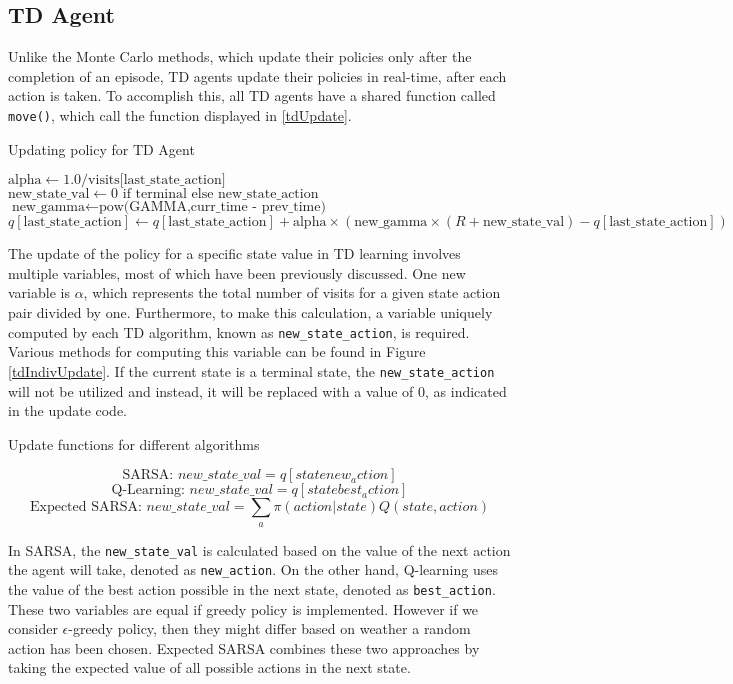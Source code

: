 \subsection{TD Agent}	
Unlike the Monte Carlo methods, which update their policies only after the completion of an episode, TD agents update their policies in real-time, after each action is taken. To accomplish this, all TD agents have a shared function called \texttt{move()}, which call the function displayed in \ref{tdUpdate}. 

\begin{algorithm}
\caption{Updating policy for TD Agent}\label{tdUpdate}
\begin{algorithmic}[1]
\State $ \text{alpha} \gets 1.0 / \text{visits[last_state_action]}$
\State $\text{new_state_val} \gets 0 \text{ if terminal else new_state_action}$
\State $\text{new_gamma} \gets \text{pow(GAMMA,curr_time - prev_time)}$
\State $q[\text{last_state_action}] \gets q[\text{last_state_action}] + \text{alpha} \times (\text{new_gamma} \times (R + \text{new_state_val}) - q[\text{last_state_action}])$
\end{algorithmic}
\end{algorithm}


The update of the policy for a specific state value in TD learning involves multiple variables, most of which have been previously discussed. One new variable is $\alpha$, which represents the total number of visits for a given state action pair divided by one. Furthermore, to make this calculation, a variable uniquely computed by each TD algorithm, known as \texttt{new\_state\_action}, is required. Various methods for computing this variable can be found in Figure \ref{tdIndivUpdate}. If the current state is a terminal state, the \texttt{new\_state\_action} will not be utilized and instead, it will be replaced with a value of 0, as indicated in the update code.

\begin{algorithm}
\caption{Update functions for different algorithms}\label{tdIndivUpdate}
\begin{algorithmic}
\State $$ \text{SARSA: } new\_state\_val = q[state new_action] $$ 
\State $$ \text{Q-Learning: } new\_state\_val = q[state best_action] $$ 
\State $$ \text{Expected SARSA: } new\_state\_val = \sum_a \pi (action|state) Q(state,action) $$ 
\end{algorithmic}
\end{algorithm}

In SARSA, the \texttt{new\_state\_val} is calculated based on the value of the next action the agent will take, denoted as \texttt{new\_action}. On the other hand, Q-learning uses the value of the best action possible in the next state, denoted as \texttt{best\_action}. These two variables are equal if greedy policy is implemented. However if we consider $\epsilon$-greedy policy, then they might differ based on weather a random action has been chosen. Expected SARSA combines these two approaches by taking the expected value of all possible actions in the next state. 

